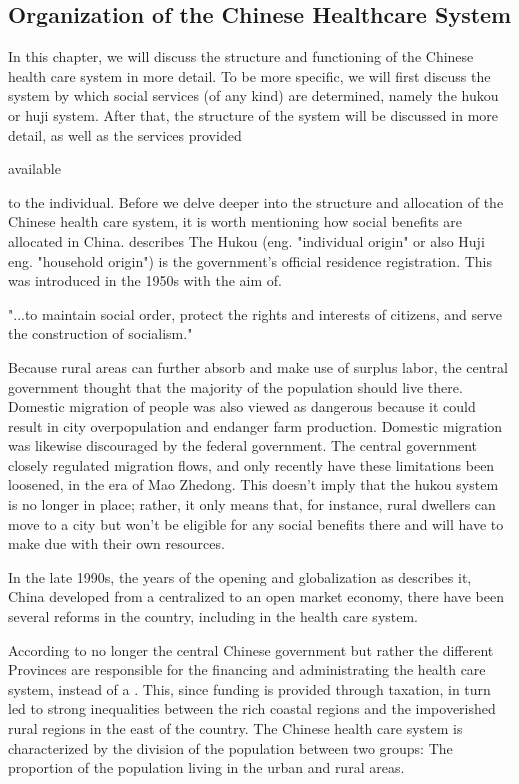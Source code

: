 \documentclass[]{article}
\begin{document}
\subsection{Organization of the Chinese Healthcare System} \label{orga}
In this chapter, we will discuss the structure and functioning of the Chinese health care system in more detail. To be more specific, we will first discuss the system by which social services (of any kind) are determined, namely the hukou or huji system. After that, the structure of the system will be discussed in more detail, as well as the services  provided\begin{flushleft}
	available
\end{flushleft} to the individual. 
Before we delve deeper into the structure and allocation of the Chinese health care system, it is worth mentioning how social benefits are allocated in China. \cite{liu_institution_2005} describes The Hukou (eng. "individual origin" or also Huji eng. "household origin") is the government's official residence registration. This was introduced in the 1950s with the aim of. 

"...to maintain social order, protect the rights and interests of citizens, and serve the construction of socialism."

Because rural areas can further absorb and make use of surplus labor, the central government thought that the majority of the population should live there.
Domestic migration of people was also viewed as dangerous because it could result in city overpopulation and endanger farm production.
Domestic migration was likewise discouraged by the federal government.
The central government closely regulated migration flows, and only recently have these limitations been loosened, in the era of Mao Zhedong. This doesn't imply that the hukou system is no longer in place; rather, it only means that, for instance, rural dwellers can move to a city but won't be eligible for any social benefits there and will have to make due with their own resources.

In the late 1990s, the years of the opening and globalization as \textcite{kanbur_fifty_2005} describes it, China developed from a centralized to an open market economy, there have been several reforms in the country, including in the health care system. 

According to \textcite{hougaard_chinese_2011} no longer the central Chinese government but rather the different Provinces are responsible for the financing and administrating the health care system, instead of a . This, since funding is provided through taxation, in turn led to strong inequalities between the rich coastal regions and the impoverished rural regions in the east of the country. The Chinese health care system is characterized by the division of the population between two groups: The proportion of the population living in the urban and rural areas. 
\end{document}
